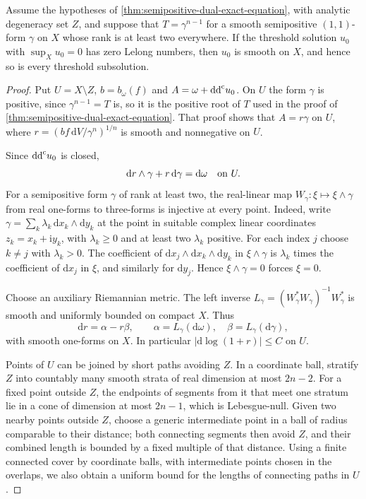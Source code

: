 \begin{theorem}\label{thm:rank-two-dual-smooth-extension}
Assume the hypotheses of \cref{thm:semipositive-dual-exact-equation}, with analytic degeneracy set $Z$, and suppose that $T=\gamma^{n-1}$ for a smooth semipositive $(1,1)$-form $\gamma$ on $X$ whose rank is at least two everywhere. If the threshold solution $u_0$ with $\sup_Xu_0=0$ has zero Lelong numbers, then $u_0$ is smooth on $X$, and hence so is every threshold subsolution.
\end{theorem}
\begin{proof}
Put $U=X\setminus Z$, $b=b_\omega(f)$ and $A=\omega+\mathrm{dd}^{\mathrm{c}} u_0$. On $U$ the form $\gamma$ is positive, since $\gamma^{n-1}=T$ is, so it is the positive root of $T$ used in the proof of \cref{thm:semipositive-dual-exact-equation}. That proof shows that $A=r\gamma$ on $U$, where $r=(bf\,\mathrm{d}V/\gamma^n)^{1/n}$ is smooth and nonnegative on $U$.

Since $\mathrm{dd}^{\mathrm{c}} u_0$ is closed,
\[
 \mathrm dr\wedge\gamma+r\,\mathrm d\gamma=\mathrm d\omega
       \quad\hbox{on }U.
\]
For a semipositive form $\gamma$ of rank at least two, the real-linear map $W_\gamma\colon\xi\mapsto\xi\wedge\gamma$ from real one-forms to three-forms is injective at every point. Indeed, write $\gamma=\sum_k\lambda_k\,\mathrm dx_k\wedge\mathrm dy_k$ at the point in suitable complex linear coordinates $z_k=x_k+\mathrm iy_k$, with $\lambda_k\geq0$ and at least two $\lambda_k$ positive. For each index $j$ choose $k\neq j$ with $\lambda_k>0$. The coefficient of $\mathrm dx_j\wedge\mathrm dx_k\wedge\mathrm dy_k$ in $\xi\wedge\gamma$ is $\lambda_k$ times the coefficient of $\mathrm dx_j$ in $\xi$, and similarly for $\mathrm dy_j$. Hence $\xi\wedge\gamma=0$ forces $\xi=0$.

Choose an auxiliary Riemannian metric. The left inverse $L_\gamma=(W_\gamma^*W_\gamma)^{-1}W_\gamma^*$ is smooth and uniformly bounded on compact $X$. Thus
\begin{equation}\label{eq:rank-two-extension-first-order}
 \mathrm dr=\alpha-r\beta,\qquad
 \alpha=L_\gamma(\mathrm d\omega),\quad
 \beta=L_\gamma(\mathrm d\gamma),
\end{equation}
with smooth one-forms on $X$. In particular $|\mathrm d\log(1+r)|\leq C$ on $U$.

Points of $U$ can be joined by short paths avoiding $Z$. In a coordinate ball, stratify $Z$ into countably many smooth strata of real dimension at most $2n-2$. For a fixed point outside $Z$, the endpoints of segments from it that meet one stratum lie in a cone of dimension at most $2n-1$, which is Lebesgue-null. Given two nearby points outside $Z$, choose a generic intermediate point in a ball of radius comparable to their distance; both connecting segments then avoid $Z$, and their combined length is bounded by a fixed multiple of that distance. Using a finite connected cover by coordinate balls, with intermediate points chosen in the overlaps, we also obtain a uniform bound for the lengths of connecting paths in $U$.


\end{proof}
